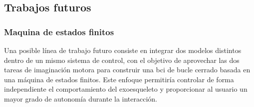 {
  }

\subsection{Trabajos futuros}

\subsubsection{Maquina de estados finitos}

Una posible línea de trabajo futuro consiste en integrar dos modelos distintos dentro de un mismo sistema de control, con el objetivo de aprovechar las dos tareas de imaginación motora para construir una \acrshort{bci} de bucle cerrado basada en una máquina de estados finitos. Este enfoque permitiría controlar de forma independiente el comportamiento del exoesqueleto y proporcionar al usuario un mayor grado de autonomía durante la interacción.

